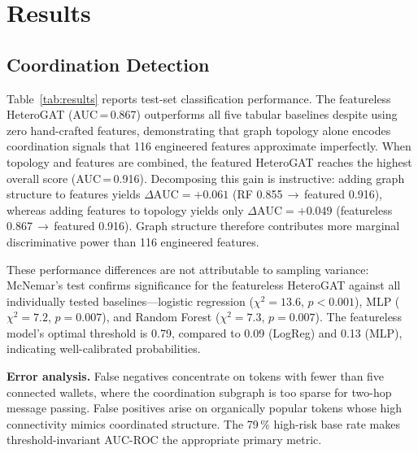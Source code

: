 \documentclass[10pt,journal]{IEEEtran}
\begin{document}
\section{Results}
\label{sec:results}

\subsection{Coordination Detection}
\label{sec:classification_results}

Table~\ref{tab:results} reports test-set classification performance.
The featureless HeteroGAT (AUC\,=\,0.867) outperforms all five tabular
baselines despite using zero hand-crafted features, demonstrating that
graph topology alone encodes coordination signals that 116 engineered
features approximate imperfectly. When topology and features are
combined, the featured HeteroGAT reaches the highest overall score
(AUC\,=\,0.916). Decomposing this gain is instructive: adding graph
structure to features yields $\Delta\text{AUC}{=}+0.061$ (RF
0.855\,$\to$\,featured 0.916), whereas adding features to topology
yields only $\Delta\text{AUC}{=}+0.049$ (featureless
0.867\,$\to$\,featured 0.916). Graph structure therefore contributes
more marginal discriminative power than 116 engineered features.

These performance differences are not attributable to sampling
variance: McNemar's test confirms significance for the featureless
HeteroGAT against all individually tested baselines---logistic
regression
($\chi^2{=}13.6$, $p{<}0.001$), MLP ($\chi^2{=}7.2$, $p{=}0.007$),
and Random Forest ($\chi^2{=}7.3$, $p{=}0.007$). The featureless model's optimal
threshold is 0.79, compared to 0.09 (LogReg) and 0.13 (MLP),
indicating well-calibrated probabilities.

\smallskip\textbf{Error analysis.}
False negatives concentrate on tokens with fewer than five connected
wallets, where the coordination subgraph is too sparse for two-hop
message passing. False positives arise on organically popular tokens
whose high connectivity mimics coordinated structure. The
79\,\% high-risk base rate makes threshold-invariant AUC-ROC the
appropriate primary metric.
\end{document}
